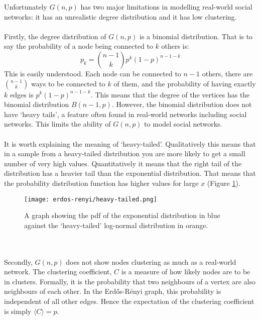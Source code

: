 Unfortunately $G(n,p)$ has two major limitations in modelling real-world social networks: it has an unrealistic degree distribution and it has low clustering.\\
\\
Firstly, the degree distribution of $G(n,p)$ is a binomial distribution. That is to say the probability of a node being connected to $k$ others is:
\begin{equation}
	p_k=\binom{n-1}{k}p^k(1-p)^{n-1-k}
\end{equation}
This is easily understood. Each node can be connected to $n-1$ others, there are $\binom{n-1}{k}$ ways to be connected to $k$ of them, and the probability of having exactly $k$ edges is $p^k(1-p)^{n-1-k}$. This means that the degree of the vertices has the binomial distribution $B(n-1,p)$. However, the binomial distribution does not have `heavy tails', a feature often found in real-world networks including social networks\cite{barabasi-albert}. This limits the ability of $G(n,p)$ to model social networks.\\
\\
It is worth explaining the meaning of `heavy-tailed'. Qualitatively this means that in a sample from a heavy-tailed distribution you are more likely to get a small number of very high values. Quantitatively it means that the right tail of the distribution has a heavier tail than the exponential distribution\cite{heavy-tailed}. That means that the probability distribution function has higher values for large $x$ (Figure \ref{fig:heavy-tailed}).
\begin{figure}
	\centering
	\texttt{[image: erdos-renyi/heavy-tailed.png]}
	\caption{A graph showing the pdf of the exponential distribution in blue against the `heavy-tailed' log-normal distribution in orange.}
	\label{fig:heavy-tailed}
\end{figure}
\label{mmd}
\\
\\
Secondly, $G(n,p)$ does not show nodes clustering as much as a real-world network. The clustering coefficient, $C$ is a measure of how likely nodes are to be in clusters. Formally, it is the probability that two neighbours of a vertex are also neighbours of each other\cite{networks}. In the Erd\H{o}s-R{\'e}nyi graph, this probability is independent of all other edges. Hence the expectation of the clustering coefficient is simply $\langle C\rangle=p$.\\
